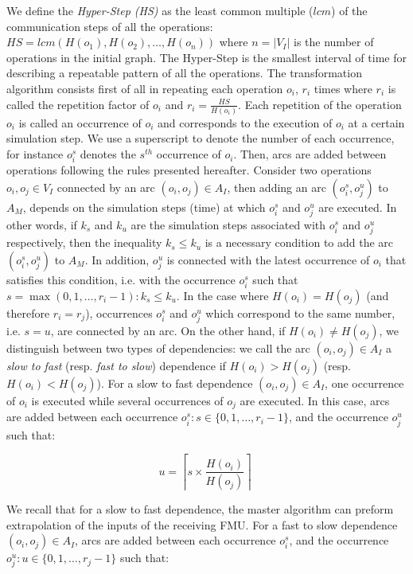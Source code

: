 We define the \textit{Hyper-Step (HS)} as the least common multiple ($lcm$) of the communication steps of all the operations: $HS=lcm(H(o_1),H(o_2), \dots ,H(o_n))$ where $n = |V_I|$ is the number of operations in the initial graph. The Hyper-Step is the smallest interval of time for describing a repeatable pattern of all the operations. The transformation algorithm consists first of all in repeating each operation $o_i$, $r_i$ times where $r_i$ is called the repetition factor of $o_i$ and $r_i = \frac{HS}{H(o_i)}$. Each repetition of the operation $o_i$ is called an occurrence of $o_i$ and corresponds to the execution of $o_i$ at a certain simulation step. We use a superscript to denote the number of each occurrence, for instance $o_i^s$ denotes the $s^{th}$ occurrence of $o_i$. Then, arcs are added between operations following the rules presented hereafter. Consider two operations $o_i, o_j \in V_I$ connected by an arc $(o_i,o_j) \in A_I$, then adding an arc $(o_i^s,o_j^u)$ to $A_M$, depends on the simulation steps (time) at which $o_i^s$ and $o_j^u$ are executed. In other words, if $k_{s}$ and $k_{u}$ are the simulation steps associated with $o_i^s$ and $o_j^u$ respectively, then the inequality $k_{s} \leq k_{u}$ is a necessary condition to add the arc $(o_i^s,o_j^u)$ to $A_M$. In addition, $o_j^u$ is connected with the latest occurrence of $o_i$ that satisfies this condition, i.e. with the occurrence $o_i^s$ such that $s=\max(0,1, \dots ,r_i-1) : k_{s} \leq k_{u}$. In the case where $H(o_i) = H(o_j)$ (and therefore $r_i = r_j$), occurrences $o_i^s$ and $o_j^u$ which correspond to the same number, i.e. $s = u$, are connected by an arc. On the other hand, if $H(o_i) \neq H(o_j)$, we distinguish between two types of dependencies: we call the arc $(o_i,o_j) \in A_I$ a \textit{slow to fast} (resp. \textit{fast to slow}) dependence if $H(o_i) > H(o_j)$ (resp. $H(o_i) < H(o_j)$). For a slow to fast dependence $(o_i,o_j) \in A_I$, one occurrence of $o_i$ is executed while several occurrences of $o_j$ are executed. In this case, arcs are added between each occurrence $o_i^s: s \in \{0,1, \dots ,r_i-1\}$, and the occurrence $o_j^u$ such that:

\begin{equation}
u = \left \lceil{s \times \frac{H(o_i)}{H(o_j)}}\right \rceil\;
\end{equation}

We recall that for a slow to fast dependence, the master algorithm can preform extrapolation of the inputs of the receiving FMU. For a fast to slow dependence $(o_i,o_j) \in A_I$, arcs are added between each occurrence $o_i^s$, and the occurrence $o_j^u: u \in \{0,1, \dots ,r_j-1\}$ such that:

